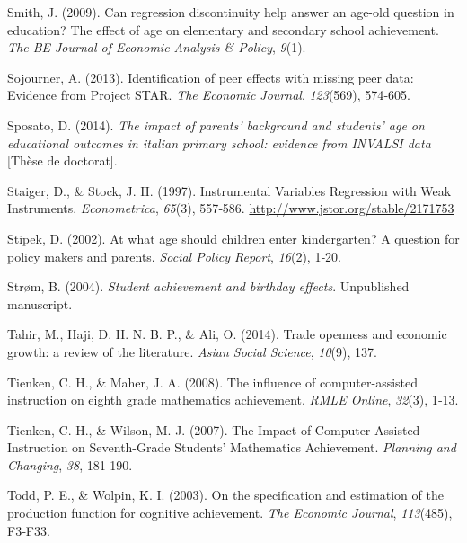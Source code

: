 \documentclass[
]{book}
\newlength{\cslhangindent}
\newlength{\cslentryspacingunit} %
\newenvironment{CSLReferences}[2] %
 {%
  \setlength{\parindent}{0pt}
  \ifodd #1
  \let\oldpar\par
  \def\par{\hangindent=\cslhangindent\oldpar}
  \fi
  \setlength{\parskip}{#2\cslentryspacingunit}
 }%
 {}
\begin{document}
\begin{CSLReferences}{1}{2}
\leavevmode{}%
Smith, J. (2009). Can regression discontinuity help answer an age-old question in education? The effect of age on elementary and secondary school achievement. \emph{The BE Journal of Economic Analysis \& Policy}, \emph{9}(1).

\leavevmode{}%
Sojourner, A. (2013). Identification of peer effects with missing peer data: Evidence from Project STAR. \emph{The Economic Journal}, \emph{123}(569), 574‑605.

\leavevmode{}%
Sposato, D. (2014). \emph{The impact of parents' background and students' age on educational outcomes in italian primary school: evidence from INVALSI data} {[}Thèse de doctorat{]}.

\leavevmode{}%
Staiger, D., \& Stock, J. H. (1997). Instrumental Variables Regression with Weak Instruments. \emph{Econometrica}, \emph{65}(3), 557‑586. \url{http://www.jstor.org/stable/2171753}

\leavevmode{}%
Stipek, D. (2002). At what age should children enter kindergarten? A question for policy makers and parents. \emph{Social Policy Report}, \emph{16}(2), 1‑20.

\leavevmode{}%
Strøm, B. (2004). \emph{Student achievement and birthday effects}. Unpublished manuscript.

\leavevmode{}%
Tahir, M., Haji, D. H. N. B. P., \& Ali, O. (2014). Trade openness and economic growth: a review of the literature. \emph{Asian Social Science}, \emph{10}(9), 137.

\leavevmode{}%
Tienken, C. H., \& Maher, J. A. (2008). The influence of computer-assisted instruction on eighth grade mathematics achievement. \emph{RMLE Online}, \emph{32}(3), 1‑13.

\leavevmode{}%
Tienken, C. H., \& Wilson, M. J. (2007). The Impact of Computer Assisted Instruction on Seventh-Grade Students' Mathematics Achievement. \emph{Planning and Changing}, \emph{38}, 181‑190.

\leavevmode{}%
Todd, P. E., \& Wolpin, K. I. (2003). On the specification and estimation of the production function for cognitive achievement. \emph{The Economic Journal}, \emph{113}(485), F3‑F33.


\end{CSLReferences}
\end{document}
